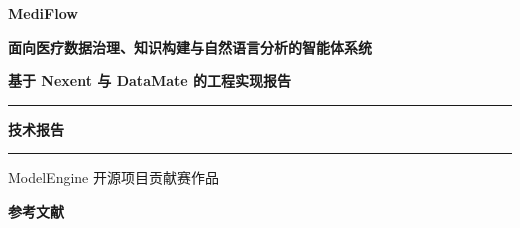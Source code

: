 \documentclass[UTF8,oneside,openany,zihao=-4,scheme=chinese,fontset=windows]{ctexrep}
\begin{document}
\begin{titlepage}
  \centering
  \vspace*{3.4cm}

  {\bfseries MediFlow\par}
  \vspace{0.9cm}
  {\bfseries 面向医疗数据治理、知识构建与自然语言分析的智能体系统\par}
  \vspace{0.25cm}
  {\bfseries 基于 Nexent 与 DataMate 的工程实现报告\par}

  \vspace{2.4cm}
  \rule{0.58\textwidth}{0.8pt}\par
  \vspace{0.75cm}
  {\bfseries 技术报告\par}
  \vspace{0.75cm}
  \rule{0.58\textwidth}{0.8pt}\par

  \vfill
  {ModelEngine 开源项目贡献赛作品\par}
  \vspace{2.2cm}
\end{titlepage}

\begingroup
\linespread{1.0}\selectfont
\tableofcontents
\endgroup
\clearpage














\appendix


{}
\begingroup
\small
\setlength{\bibitemsep}{0.25\baselineskip}
\par\bigskip
{\large\bfseries 参考文献\par}
\medskip
\printbibliography[heading=none]
\endgroup
\end{document}
